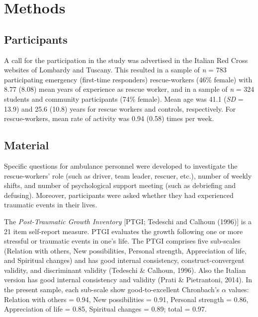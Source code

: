 \documentclass[
  english,
  man,floatsintext]{apa7}
\begin{document}
\hypertarget{methods}{%
\section{Methods}\label{methods}}

\hypertarget{participants}{%
\subsection{Participants}\label{participants}}

A call for the participation in the study was advertised in the Italian Red Cross websites of Lombardy and Tuscany. This resulted in a sample of \emph{n} = 783 participating emergency (first-time responders) rescue-workers (46\% female) with 8.77 (8.08) mean years of experience as rescue worker, and in a sample of \emph{n} = 324 students and community participants (74\% female). Mean age was 41.1 (\emph{SD} = 13.9) and 25.6 (10.8) years for rescue workers and controls, respectively. For rescue-workers, mean rate of activity was 0.94 (0.58) times per week.

\hypertarget{material}{%
\subsection{Material}\label{material}}

Specific questions for ambulance personnel were developed to investigate the rescue-workers' role (such as driver, team leader, rescuer, etc.), number of weekly shifts, and number of psychological support meeting (such as debriefing and defusing). Moreover, participants were asked whether they had experienced traumatic events in their lives.

The \emph{Post-Traumatic Growth Inventory} {[}PTGI; Tedeschi and Calhoun (1996){]} is a 21 item self-report measure.
PTGI evaluates the growth following one or more stressful or traumatic events in one's life. The PTGI comprises five sub-scales (Relation with others, New possibilities, Personal strength, Appreciation of life, and Spiritual changes) and has good internal consistency, construct-convergent validity, and discriminant validity (Tedeschi \& Calhoun, 1996). Also the Italian version has good internal consistency and validity (Prati \& Pietrantoni, 2014).
In the present sample, each sub-scale show good-to-excellent Chronbach's \(\alpha\) values: Relation with others = 0.94, New possibilities = 0.91, Personal strength = 0.86, Appreciation of life = 0.85, Spiritual changes = 0.89; total = 0.97.
\end{document}
